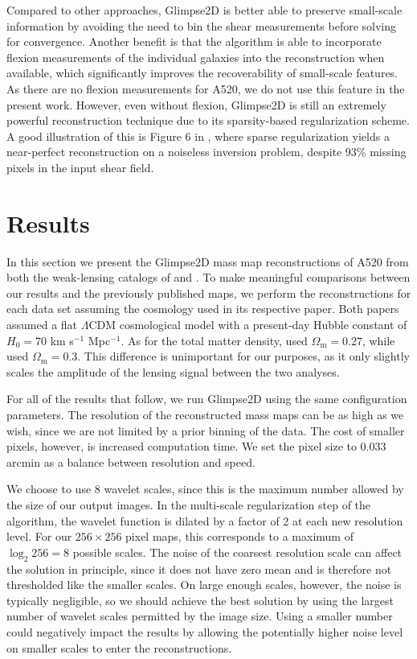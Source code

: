 \documentclass[iop,twocolappendix]{emulateapj}
\newcommand{\cta}[1]{\citetalias{#1}}
\begin{document}
Compared to other approaches, Glimpse2D is better able to preserve small-scale information by 
avoiding the need to bin the shear measurements before solving for convergence.
Another benefit is that the algorithm is able to incorporate flexion measurements of the 
individual galaxies into the reconstruction when available, which significantly improves the 
recoverability of small-scale features. As there are no flexion measurements for A520, we do not 
use this feature in the present work. However, even without flexion, Glimpse2D is still an 
extremely powerful reconstruction technique due to its sparsity-based regularization scheme. A 
good illustration of this is Figure 6 in \citet{LSL.etal.2016}, where sparse regularization
yields a near-perfect reconstruction on a noiseless inversion problem, despite 93\% missing
pixels in the input shear field.

\section{Results}\label{sec:results}
In this section we present the Glimpse2D mass map reconstructions of A520 from both the 
weak-lensing catalogs of \cta{C12} and \cta{J14}. To make meaningful comparisons
between our results and the previously published maps, we perform the reconstructions for each data
set assuming the cosmology used in its respective paper. Both papers assumed a flat $\Lambda$CDM 
cosmological model with a present-day Hubble constant of $H_0=70$ km s${}^{-1}$ Mpc${}^{-1}$.
As for the total matter density, \cta{C12} used $\Omega_\mathrm{m}=0.27$, while
\cta{J14} used $\Omega_\mathrm{m}=0.3$. This difference is unimportant for our purposes,
as it only slightly scales the amplitude of the lensing signal between the two analyses. 

For all of the results that follow, we run Glimpse2D using the same configuration parameters. 
The resolution of the reconstructed mass maps can be as high as we wish, since we are not limited 
by a prior binning of the data. The cost of smaller pixels, however, is increased computation 
time. We set the pixel size to 0.033 arcmin as a balance between resolution and speed. 

We choose to use 8 wavelet scales, since this is the maximum number allowed by the size
of our output images. In the multi-scale regularization step of the algorithm, the wavelet function 
is dilated by a factor of 2 at each new resolution level. For our $256\times256$ pixel maps, this
corresponds to a maximum of $\log_2 256=8$ possible scales. The noise of the coarsest resolution scale
can affect the solution in principle, since it does not have zero mean and is therefore not 
thresholded like the smaller scales. On large enough scales, however, the noise is typically 
negligible, so we should achieve the best solution by using the largest number of wavelet scales 
permitted by the image size. Using a smaller number could negatively impact the results by
allowing the potentially higher noise level on smaller scales to enter the reconstructions.
\end{document}
